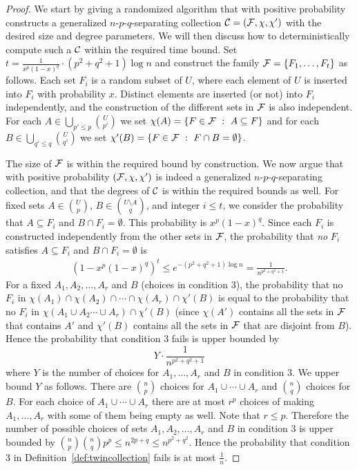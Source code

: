 \begin{proof}
We start by giving a randomized algorithm that with positive probability constructs a generalized $n$-$p$-$q$-separating collection ${\cal C} = ({\cal F},\chi, \chi')$ with the desired size and degree parameters. 
We will then discuss how to deterministically compute such a ${\cal C}$ within the required time bound. Set $t = \frac{1}{x^p(1-x)^q} \cdot (p^2+q^2+1)\log n$ and construct the family 
${\cal F} = \{F_1, \ldots, F_t\}$ as follows. Each set $F_i$ is a random subset of $U$, where each element of $U$ is inserted into $F_i$ with probability $x$. Distinct elements are inserted (or not) into $F_i$ 
independently, and the construction of the different sets in ${\cal F}$ is also independent. For each  $A \in \bigcup_{p'\leq p}{U\choose p'}$ we set $\chi(A) = \{F \in {\cal F}~:~A \subseteq F\}$ and 
for each $B\in \bigcup_{q'\leq q}{U\choose q'}$ we set $\chi'(B)=\{F\in {\cal F}~:~F\cap B=\emptyset\}$.

The size of ${\cal F}$ is within the required bound by construction. We now argue that with positive probability 
$({\cal F},\chi, \chi')$ is indeed a generalized $n$-$p$-$q$-separating collection, and that the degrees of ${\cal C}$ 
is within the required bounds as well. For fixed sets $A \in {U \choose p}$, $B \in {U\setminus A \choose q}$, and integer $i \leq t$, we consider the probability that $A \subseteq F_i$ and $B \cap F_i = \emptyset$. 
This probability is $x^{p}(1-x)^q$. Since each $F_i$ is constructed independently from the other sets in ${\cal F}$, the probability that {\em no} $F_i$ satisfies $A \subseteq F_i$ and $B \cap F_i = \emptyset$ is
\begin{align*} \left(1 - x^p(1-x)^q\right)^t \leq e^{-(p^2+q^2+1)\log n} = \frac{1}{n^{p^2+q^2+1}}.\end{align*}
For a fixed $A_1,A_2,\ldots,A_r$ and $B$ (choices in condition $3$), the probability that no $F_i$ in $\chi(A_1)\cap\chi(A_2)\cap \cdots \cap\chi(A_r)\cap \chi'(B)$ is equal to the 
probability that no $F_i$ in $\chi(A_1\cup A_2\cdots \cup A_r)\cap \chi'(B)$  (since $\chi(A')$ contains all 
the sets in ${\cal F}$ that contains $A'$ and $\chi'(B)$ contains all the sets in ${\cal F}$ that are disjoint from $B$). 
Hence the probability that condition $3$ fails is upper bounded by 
$$Y\cdot\frac{1}{n^{p^2+q^2+1}}$$
where $Y$ is the number of choices for $A_1,\ldots,A_r$ and $B$ in condition $3$. We upper bound $Y$ as follows.
There are ${n \choose p}$ choices for $A_1\cup\cdots\cup A_r$ and ${n \choose q}$ choices for $B$. 
For each choice of $A_1\cup\cdots\cup A_r$ there are at most $r^p$ choices of making $A_1,\ldots,A_r$ with some of them being empty as well. Note that $r\leq p$. 
Therefore the number of possible choices of sets $A_1,A_2,\ldots,A_r$ and $B$ in condition $3$ is upper bounded by ${n\choose p}{n\choose q}p^p\leq n^{2p+q}\leq n^{p^2+q^2}$. 
Hence the probability that condition $3$ in Definition~\ref{def:twincollection} fails is at most $\frac{1}{n}$.


\end{proof}
